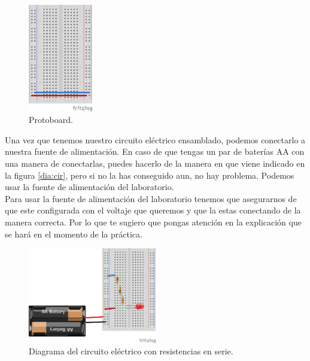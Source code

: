     \begin{figure}[h]
    	\begin{center}
    		\includegraphics[width=0.25\textwidth]{images/protoboard.png}
    		\caption{Protoboard.}
    		\label{dia:proto}
    	\end{center}
    \end{figure}

    Una vez que tenemos nuestro circuito eléctrico ensamblado, podemos conectarlo a nuestra fuente de alimentación. En caso de que tengas un par de baterías AA con una manera de conectarlas, puedes hacerlo de la manera en que viene indicado en la figura \ref{dia:cir}, pero si no la has conseguido aun, no hay problema. Podemos usar la fuente de alimentación del laboratorio. \\

    Para usar la fuente de alimentación del laboratorio tenemos que asegurarnos de que este configurada con el voltaje que queremos y que la estas conectando de la manera correcta. Por lo que te sugiero que pongas atención en la explicación que se hará en el momento de la práctica. \\

    \begin{figure}[h]
    	\begin{center}
    		\includegraphics[width=0.5\textwidth]{images/LED-bateria-resistencias.png}
    		\caption{Diagrama del circuito eléctrico con resistencias en serie.}
    		\label{dia:serie}
    	\end{center}
    \end{figure}

